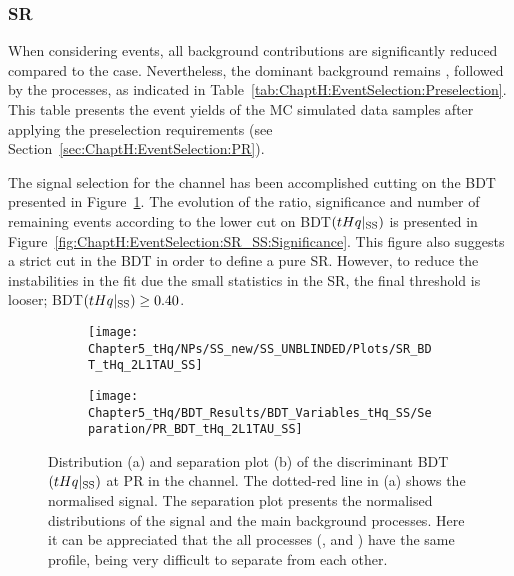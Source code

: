 \FloatBarrier
\subsubsection{SR \dilepSStau}
\label{sec:ChaptH:EventSelection:SR:SS}
When considering \dilepSStau events, all background contributions 
are significantly reduced compared to the \dilepOStau case. Nevertheless, the dominant 
background remains \ttbar, followed by the \ttX processes, as indicated in 
Table~\ref{tab:ChaptH:EventSelection:Preselection}.  This table presents the event yields 
of the MC simulated data samples after applying the preselection requirements 
(see Section~\ref{sec:ChaptH:EventSelection:PR}). 

The signal selection for the \dilepSStau channel has been accomplished 
cutting on the BDT presented in Figure~\ref{fig:ChaptH:EventSelection:SR:SS:BDT_score_distribution}.
The evolution of the \StoB ratio, significance and number of remaining \tHq events according to the 
lower cut on BDT$(tHq|_{\text{SS}})$ is presented in Figure~\ref{fig:ChaptH:EventSelection:SR_SS:Significance}. 
This figure also suggests a strict cut in the BDT in order to define a pure SR. 
However, to reduce the instabilities in the fit due the small statistics in the SR, the final
threshold is looser; BDT$(tHq|_{\text{SS}})\geq 0.40$. 

\begin{figure}[h]
\centering
\begin{subfigure}{.45\textwidth}
  \centering
  \texttt{[image: Chapter5\_tHq/NPs/SS\_new/SS\_UNBLINDED/Plots/SR\_BDT\_tHq\_2L1TAU\_SS]}
  \caption{}%
\end{subfigure}%
\begin{subfigure}{.5 \textwidth}
  \centering
  \texttt{[image: Chapter5\_tHq/BDT\_Results/BDT\_Variables\_tHq\_SS/Separation/PR\_BDT\_tHq\_2L1TAU\_SS]}
  \caption{}%
\end{subfigure}
\caption{Distribution (a) and separation plot (b) of the discriminant BDT$(tHq|_{\text{SS}})$ at PR in the \dilepSStau channel.
The dotted-red line in (a) shows the normalised \tHq signal.
The separation plot presents the normalised distributions of the \tHq signal and the main background processes.
Here it can be appreciated that the all \ttX processes (\ttW,  \ttH and \ttZ) have the same profile, being very difficult to separate from 
each other.}
\label{fig:ChaptH:EventSelection:SR:SS:BDT_score_distribution}
\end{figure}


